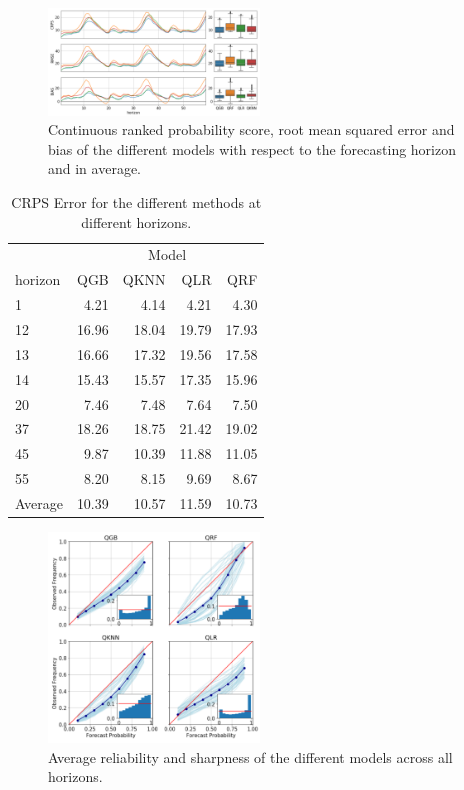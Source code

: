 \documentclass[a4paper,twocolumn,5p]{elsarticle}
\begin{document}
\begin{figure}[tbp]
  \centering
  \includegraphics[width=0.5\textwidth]{error_graph}
  \caption{\label{figure:errorGraph}
    Continuous ranked probability score, root mean squared
    error and bias of the different models with respect to the
    forecasting horizon and in average.
  }
\end{figure}

\begin{table}[tbp]
  \centering
  \caption{\label{tab:determ}CRPS Error for the different methods at different
    horizons.
  }
  \begin{tabular}{lrrrr}
    \toprule
    & \multicolumn{4}{c}{Model} \\ \cmidrule{2-5} 
    horizon &    QGB &  QKNN &   QLR &   QRF \\
    \midrule
    1     &  4.21 &   4.14 &  4.21 &  4.30 \\
12    & 16.96 &  18.04 & 19.79 & 17.93 \\
13    & 16.66 &  17.32 & 19.56 & 17.58 \\
14    & 15.43 &  15.57 & 17.35 & 15.96 \\
20    &  7.46 &   7.48 &  7.64 &  7.50 \\
37    & 18.26 &  18.75 & 21.42 & 19.02 \\
45    &  9.87 &  10.39 & 11.88 & 11.05 \\
55    &  8.20 &   8.15 &  9.69 &  8.67 \\

    \midrule
    Average & 10.39 &  10.57 & 11.59 & 10.73 \\
    \bottomrule
  \end{tabular}
\end{table}

\begin{figure}
  \centering
  \includegraphics[width=0.5\textwidth]{reliability_sharpness}
  \caption{\label{figure:rel_sharp}Average reliability and sharpness
    of the different models across all horizons.}
\end{figure}
\end{document}
